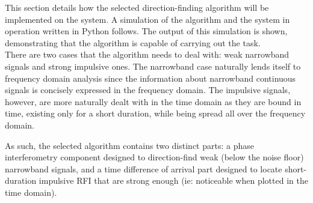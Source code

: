 This section details how the selected direction-finding algorithm will be implemented on the system. A simulation of the algorithm and the system in operation written in Python follows. The output of this simulation is shown, demonstrating that the algorithm is capable of carrying out the task.\\

There are two cases that the algorithm needs to deal with: weak narrowband signals and strong impulsive ones. The narrowband case naturally lends itself to frequency domain analysis since the information about narrowband continuous signals is concisely expressed in the frequency domain. The impulsive signals, however, are more naturally dealt with in the time domain as they are bound in time, existing only for a short duration, while being spread all over the frequency domain. 

As such, the selected algorithm contains two distinct parts: a phase interferometry component designed to direction-find weak (below the noise floor) narrowband signals, and a time difference of arrival part designed to locate short-duration impulsive RFI that are strong enough (ie: noticeable when plotted in the time domain).

